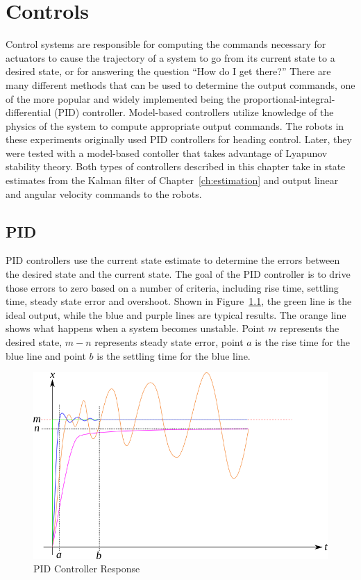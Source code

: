 \chapter{Controls}%
\label{ch:controls}
Control systems are responsible for computing the commands necessary for actuators to cause the trajectory of a system to go from its current state to a desired state, or for answering the question ``How do I get there?'' There are many different methods that can be used to determine the output commands, one of the more popular and widely implemented being the proportional-integral-differential (PID) controller.
Model-based controllers utilize knowledge of the physics of the system to compute appropriate output commands.
The robots in these experiments originally used PID controllers for heading control.
Later, they were tested with a model-based contoller that takes advantage of Lyapunov stability theory.
Both types of controllers described in this chapter take in state estimates from the Kalman filter of Chapter~\ref{ch:estimation} and output linear and angular velocity commands to the robots.

\section{PID}%
\label{sec:pid}
PID controllers use the current state estimate to determine the errors between the desired state and the current state.
The goal of the PID controller is to drive those errors to zero based on a number of criteria, including rise time, settling time, steady state error and overshoot.
Shown in Figure~\ref{fig:pid}, the green line is the ideal output, while the blue and purple lines are typical results.
The orange line shows what happens when a system becomes unstable.
Point $m$ represents the desired state, $m-n$ represents steady state error, point $a$ is the rise time for the blue line and point $b$ is the settling time for the blue line.

\begin{figure}[ht!]
\centering
\includegraphics[width=.85\textwidth]{images/pid}
\caption{PID Controller Response}%
\label{fig:pid}
\end{figure}

